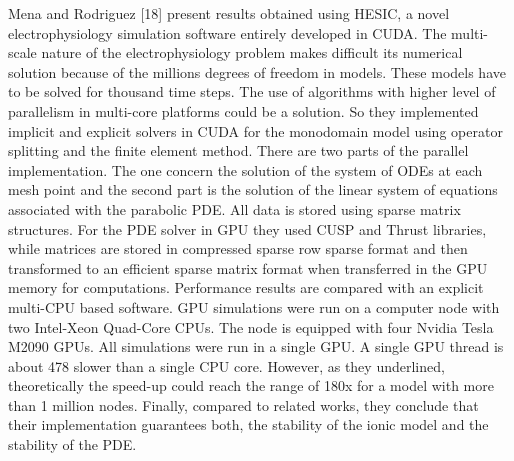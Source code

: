 Mena and Rodriguez [18] present results obtained using HESIC, a novel electrophysiology simulation software entirely developed in CUDA. The multi-scale nature of the electrophysiology problem makes difficult its numerical solution because of the millions degrees of freedom in models. These models have to be solved for thousand time steps. The use of algorithms with higher level of parallelism in multi-core platforms could be a solution. So they implemented implicit and explicit solvers in CUDA for the monodomain model using operator splitting and the finite element method. There are two parts of the parallel implementation. The one concern the solution of the system of ODEs at each mesh point and the second part is the solution of the linear system of equations associated with the parabolic PDE. All data is stored using sparse matrix structures. For the PDE solver in GPU they used CUSP and Thrust libraries, while matrices are stored in compressed sparse row sparse format and then transformed to an efficient sparse matrix format when transferred in the GPU memory for computations. Performance results are compared with an explicit multi-CPU based software. GPU simulations were run on a computer node with two Intel-Xeon Quad-Core CPUs. The node is equipped with four Nvidia Tesla M2090 GPUs. All simulations were run in a single GPU. A single GPU thread is about 478 slower than a single CPU core. However, as they underlined, theoretically the speed-up could reach the range of 180x for a model with more than 1 million nodes. Finally, compared to related works, they conclude that their implementation guarantees both, the stability of the ionic model and the stability of the PDE.


